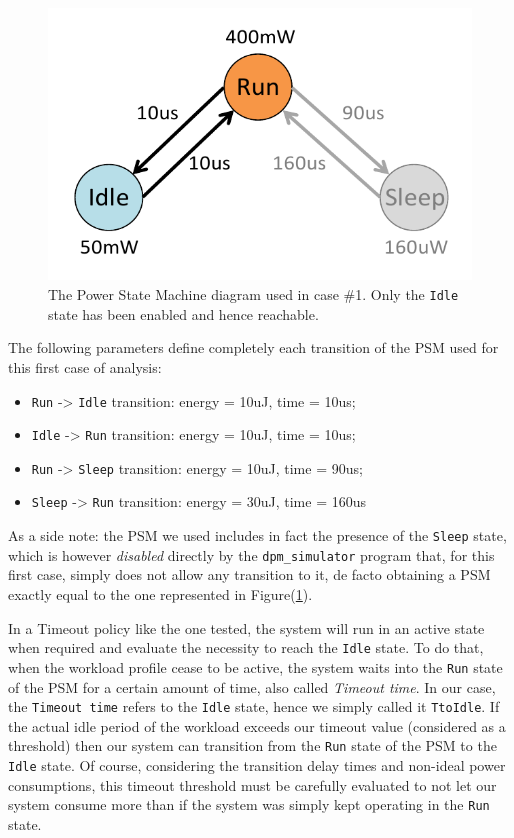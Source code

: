 \documentclass[a4paper]{article}
\begin{document}
            \begin{figure}[htp]
                \centering
                \includegraphics[width=0.4 \columnwidth]{./screenshots/PSM_case1.png}
                \caption{
                        \label{fig:PSM_case1}
                        The Power State Machine diagram used in case \#1. Only the \texttt{Idle} state has been enabled and hence reachable.
                }
            \end{figure}

            The following parameters define completely each transition of the PSM used for this first case of analysis:
            \begin{itemize}
                \item \texttt{Run} -> \texttt{Idle} transition: energy  = 10uJ, time = 10us;
                \item \texttt{Idle} -> \texttt{Run} transition: energy  = 10uJ, time = 10us;
                \item \texttt{Run} -> \texttt{Sleep} transition: energy  = 10uJ, time = 90us;
                \item \texttt{Sleep} -> \texttt{Run} transition: energy  = 30uJ, time = 160us
            \end{itemize}

            As a side note: the PSM we used includes in fact the presence of the \texttt{Sleep} state, which is however \emph{disabled} directly by the \texttt{dpm\_simulator} program that, for this first case, simply does not allow any transition to it, de facto obtaining a PSM exactly equal to the one represented in Figure(\ref{fig:PSM_case1}).

            In a Timeout policy like the one tested, the system will run in an active state when required and evaluate the necessity to reach the \texttt{Idle} state. To do that, when the workload profile cease to be active, the system waits into the \texttt{Run} state of the PSM for a certain amount of time, also called \emph{Timeout time}. In our case, the \texttt{Timeout time} refers to the \texttt{Idle} state, hence we simply called it \texttt{TtoIdle}. If the actual idle period of the workload exceeds our timeout value (considered as a threshold) then our system can transition from the \texttt{Run} state of the PSM to the \texttt{Idle} state. Of course, considering the transition delay times and non-ideal power consumptions, this timeout threshold must be carefully evaluated to not let our system consume more than if the system was simply kept operating in the \texttt{Run} state.
\end{document}
